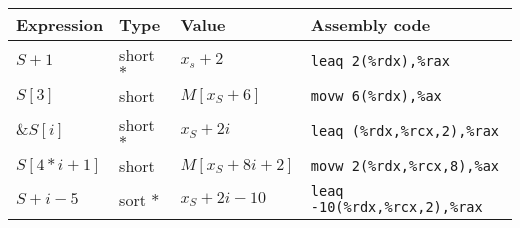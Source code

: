 \documentclass{article}
\begin{document}
\begin{tabular}{l l l l}
	Expression & Type & Value & Assembly code \\
	\hline
	$S+1$ & short $*$ & $x_s+2$ & \texttt{leaq 2(\%rdx),\%rax} \\
	$S[3]$ & short & $M[x_S+6]$ & \texttt{movw 6(\%rdx),\%ax} \\
	$\&S[i]$ & short $*$ & $x_S+2i$ & \texttt{leaq (\%rdx,\%rcx,2),\%rax} \\
	$S[4*i+1]$ & short & $M[x_S+8i+2]$ & \texttt{movw 2(\%rdx,\%rcx,8),\%ax} \\
	$S+i-5$ & sort $*$ & $x_S+2i-10$ & \texttt{leaq -10(\%rdx,\%rcx,2),\%rax} \\
	\hline
\end{tabular}
\end{document}
